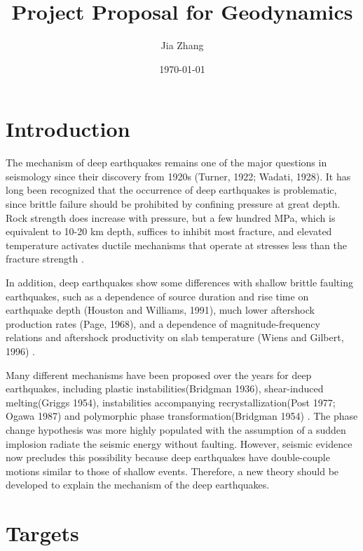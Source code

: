 \documentclass[12pt]{article}
\begin{document}

\title{Project Proposal for Geodynamics}
\author{Jia Zhang}
\date{\today}

\maketitle


\section{Introduction}

The mechanism of deep earthquakes remains one of the major questions in
seismology since their discovery from 1920s (Turner, 1922; Wadati, 1928).
It has long been recognized that the occurrence of deep earthquakes
is problematic, since brittle failure should be prohibited by confining pressure
at great depth. Rock strength does increase with pressure, but a few hundred MPa,
which is equivalent to 10-20 km depth, suffices to inhibit most fracture, and
elevated temperature activates ductile mechanisms that operate at stresses less
than the fracture strength
\cite{green1989}.

In addition, deep earthquakes show some differences with shallow brittle faulting earthquakes,
such as a dependence of source duration and rise time on earthquake depth (Houston and Williams, 1991),
much lower aftershock production rates (Page, 1968), and a dependence of magnitude-frequency
relations and aftershock productivity on slab temperature (Wiens and Gilbert, 1996)
\cite{wiens2001}.

Many different mechanisms have been proposed over the years for deep earthquakes, including plastic instabilities(Bridgman 1936), shear-induced melting(Griggs 1954), instabilities accompanying
recrystallization(Post 1977; Ogawa 1987) and polymorphic phase transformation(Bridgman 1954)
\cite{green1995}.
The phase change hypothesis was more highly populated with the assumption of a sudden implosion radiate the seismic energy without faulting. However, seismic evidence now precludes this possibility because deep earthquakes have double-couple motions similar to those of shallow events. Therefore, a new theory should be developed to explain the mechanism of the deep earthquakes.


\section{Targets}
\end{document}
